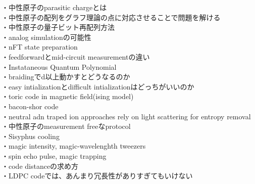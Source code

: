 \documentclass[a4paper,10.5pt]{ltjsarticle}
\begin{document}
・中性原子のparasitic chargeとは\\
・中性原子の配列をグラフ理論の点に対応させることで問題を解ける\\
・中性原子の量子ビット再配列方法\\
・analog simulationの可能性\\
・nFT state preparation\\
・feedforwardとmid-circuit measurementの違い\\
・Instataneous Quantum Polynomial\\
・braidingでd以上動かすとどうなるのか\\
・easy intializationとdifficult intializationはどっちがいいのか\\
・toric code in magnetic field(ising model)\\
・bacon-shor code\\
・neutral adn traped ion approaches rely on light scattering for entropy removal\\
・中性原子のmeasurement freeなprotocol\\
・Sisyphus cooling\\
・magic intensity, magic-wavelenghth tweezers\\
・spin echo pulse, magic trapping\\
・code distanceの求め方\\
・LDPC codeでは、あんまり冗長性がありすぎてもいけない\\
\end{document}
